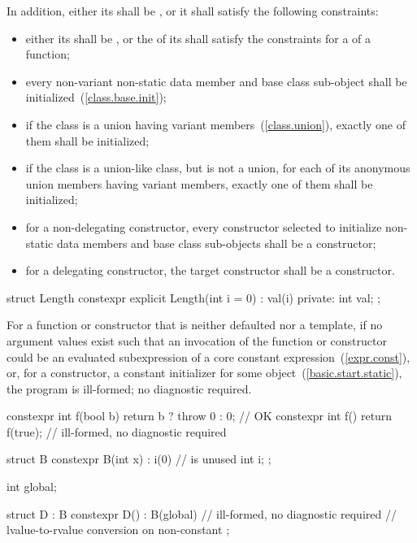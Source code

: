 In addition, either its  shall be
, or it shall satisfy the following constraints:

\begin{itemize}
\item
either its  shall be , or the  of its 
shall satisfy the constraints for a  of a
 function;

\item
every non-variant non-static data member and base class sub-object
shall be initialized~(\ref{class.base.init});

\item
if the class is a union having variant members~(\ref{class.union}), exactly one of them
shall be initialized;

\item
if the class is a union-like class, but is not a union, for each of its anonymous union
members having variant members, exactly one of them shall be initialized;

\item
for a non-delegating constructor, every constructor selected to initialize non-static
data members and base class sub-objects shall be a  constructor;

\item
for a delegating constructor, the target constructor shall be a 
constructor.
\end{itemize}

\enterexample
\begin{codeblock}
struct Length { 
  constexpr explicit Length(int i = 0) : val(i) { }
private: 
  int val; 
}; 
\end{codeblock}
\exitexample

\pnum
For a  function or  constructor
that is neither defaulted nor a template,
if no argument values exist such that
an invocation of the function or constructor could be an evaluated subexpression of a core
constant expression~(\ref{expr.const}), or,
for a constructor, a constant initializer for some object~(\ref{basic.start.static}),
the program is ill-formed; no diagnostic required.
\enterexample
\begin{codeblock}
constexpr int f(bool b)
  { return b ? throw 0 : 0; }               // OK
constexpr int f() { return f(true); }       // ill-formed, no diagnostic required

struct B {
  constexpr B(int x) : i(0) { }             //  is unused
  int i;
};

int global;

struct D : B {
  constexpr D() : B(global) { }             // ill-formed, no diagnostic required
                                            // lvalue-to-rvalue conversion on non-constant 
};
\end{codeblock}

